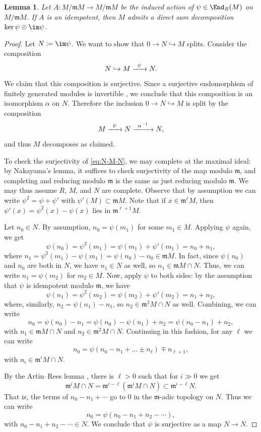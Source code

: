 \documentclass[12pt]{amsart}
\def\m{\mathfrak m}
\let\inc\hookrightarrow
\theoremstyle{theorem}
\numberwithin{thm}{section}
\newtheorem{lem}[thm]{Lemma}
\theoremstyle{definition}
\begin{document}
\begin{lem}\label{lem:idemp}
  Let $A\colon M/\m M\to M/\m M$ be the induced action of $\psi\in\End_R(M)$ on $M/\m M$. If $A$ is an idempotent, then $M$ admits a direct sum decomposition $\ker\psi \oplus \im\psi$.
\end{lem}
\begin{proof}
  Let $N \coloneqq \im\psi$. We want to show that $0 \to N \inc M$ splits. Consider the composition
  \begin{equation}\label{eq:N-M-N}
    N \inc M \xra{\psi} N.
  \end{equation}
  We claim that this composition is surjective. Since a surjective endomorphism of finitely generated modules is invertible \cite[Corollary~4.4]{Eisenbud95}, we conclude that this composition is an isomorphism $\alpha$ on $N$.
  Therefore the inclusion $ 0 \to N \inc M $ is split by the composition
  \[ M \xra{\psi} N \xra{\alpha\inv} N, \]
  and thus $M$ decomposes as claimed.

  To check the surjectivity of \eqref{eq:N-M-N}, we may complete at the maximal ideal: by Nakayama's lemma, it suffices to check surjectivity of the map modulo $\mathfrak m$, and completing and reducing modulo $\mathfrak m$ is the same as just reducing modulo $\mathfrak m$. We may thus assume $R$, $M$, and $N$ are complete. Observe that by assumption we can write $\psi^2 = \psi + \psi'$ with $\psi'(M)\subset \m M$.
  Note that if $x \in \m^\ell M$, then $\psi'(x) = \psi^2(x) - \psi(x)$ lies in $\m^{\ell+1}M$.


  Let $n_0\in N$. By assumption, $n_0 = \psi(m_1)$ for some $m_1\in M$. Applying $\psi$ again, we get
  \[ \psi(n_0) = \psi^2(m_1) = \psi(m_1) + \psi'(m_1) = n_0 + n_1, \]
  where $n_1 = \psi^2(m_1) - \psi(m_1) = \psi(n_0) - n_0 \in \m M$. In fact, since $\psi(n_0)$ and $n_0$ are both in $N$, we have $n_1\in N$ as well, so $n_1\in \m M\cap N$. Thus, we can write $n_1 = \psi(m_2)$ for $m_2\in M$.
  Now, apply $\psi$ to both sides: by the assumption that $\psi$ is idempotent modulo $\m$, we have
  \[ \psi(n_1)=\psi^2(m_2) = \psi(m_2) + \psi'(m_2) = n_1 + n_2, \]
  where, similarly, $n_2 = \psi(n_1) - n_1$, so $n_2 \in \m^2M\cap N$ as well.
  Combining, we can write
  \[ n_0 = \psi(n_0) - n_1 = \psi(n_0) - \psi(n_1) + n_2 = \psi(n_0 - n_1) + n_2, \]
  with $n_1\in \m M\cap N$ and $n_2\in \m^2M\cap N$. Continuing in this fashion, for any $\ell$ we can write
  \[ n_0=\psi(n_0-n_1+\dots \pm n_{\ell}) \mp n_{\ell+1}, \]
  with $n_i \in \m^i M\cap N$.

  By the Artin--Rees lemma \cite[Lemma~5.1]{Eisenbud95}, there is $\ell>0$ such that for $i\gg0$ we get
  \[ \m^i M\cap N = \m^{i-\ell} ( \m^i M\cap N)\subset \m^{i-\ell} N. \]
  That is, the terms of $n_0-n_1+\cdots$ go to 0 in the $\m$-adic topology on $N$. Thus we can write
  \[ n_0 = \psi(n_0-n_1+n_2-\cdots), \]
  with $n_0-n_1+n_2-\cdots\in N$. We conclude that $\psi$ is surjective as a map $N\to N$.
\end{proof}
\end{document}
